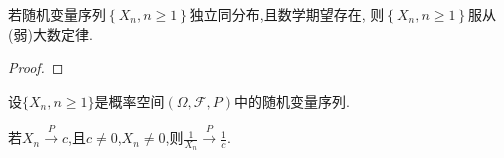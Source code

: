\documentclass[lang=cn,newtx,10pt,scheme=chinese]{../../Template/elegantbook}
\begin{document}
\begin{theorem}[Khinchin大数定律]\label{theorem:Khinchin大数定律}
    若随机变量序列$\left\{ X_n,n\ge 1 \right\}$独立同分布,且数学期望存在,
    则$\left\{ X_n,n\ge 1 \right\}$服从(弱)大数定律.
\end{theorem}
\begin{proof}
    

\end{proof}

\begin{theorem}[依概率收敛的性质]\label{theorem:依概率收敛的性质}
    设\(\{ X_n, n \geqslant 1\}\)是概率空间\((\varOmega, \mathcal{F}, P)\)中的随机变量序列.

若\(X_n \overset{P}{\rightarrow} c\),且\(c \neq 0\),\(X_n \neq 0\),则\(\frac{1}{X_n} \overset{P}{\rightarrow} \frac{1}{c}\).
\end{theorem}
\end{document}
